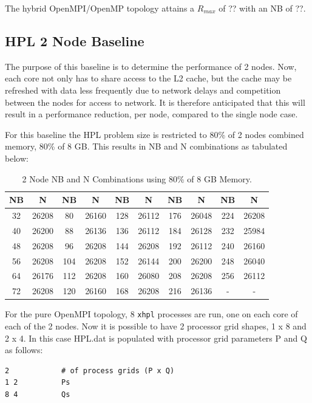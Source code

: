 \documentclass{report}
\begin{document}
The hybrid OpenMPI/OpenMP topology attains a $R_{max}$ of ?? with an NB of ??.


%
%
\subsection{HPL 2 Node Baseline}

The purpose of this baseline is to determine the performance of 2 nodes. Now, each core not only has to share access to the L2 cache, but the cache may be refreshed with data less frequently due to network delays and competition between the nodes for access to network. It is therefore anticipated that this will result in a performance reduction, per node, compared to the single node case.

For this baseline the HPL problem size is restricted to 80\% of 2 nodes combined memory, 80\% of 8 GB. This results in NB and N combinations as tabulated below:

\begin{table}[H]
\begin{center}
	\begin{tabular}{ |c|c|c|c|c|c|c|c|c|c| } 
		\hline
		NB & N & NB & N & NB & N & NB & N & NB & N \\ 
		\hline
		32 & 26208 &  80 & 26160 & 128 & 26112 & 176 & 26048 & 224 & 26208 \\ 
		40 & 26200 &  88 & 26136 & 136 & 26112 & 184 & 26128 & 232 & 25984 \\ 
 		48 & 26208 &  96 & 26208 & 144 & 26208 & 192 & 26112 & 240 & 26160 \\
		56 & 26208 & 104 & 26208 & 152 & 26144 & 200 & 26200 & 248 & 26040 \\ 
 		64 & 26176 & 112 & 26208 & 160 & 26080 & 208 & 26208 & 256 & 26112 \\
		72 & 26208 & 120 & 26160 & 168 & 26208 & 216 & 26136 &   - &     - \\ 
 		\hline
	\end{tabular}
\end{center}
\caption{\label{tab:table-name}2 Node NB and N Combinations using 80\% of 8 GB Memory.}
\end{table}

For the pure OpenMPI topology, 8 \verb|xhpl| processes are run, one on each core of each of the 2 nodes. Now it is possible to have 2 processor grid shapes, 1 x 8 and 2 x 4. In this case HPL.dat is populated with processor grid parameters P and Q as follows:

\lstset{style=listing}
\begin{lstlisting}[numbers=none]
2            # of process grids (P x Q)
1 2          Ps
8 4          Qs
\end{lstlisting}
\end{document}
